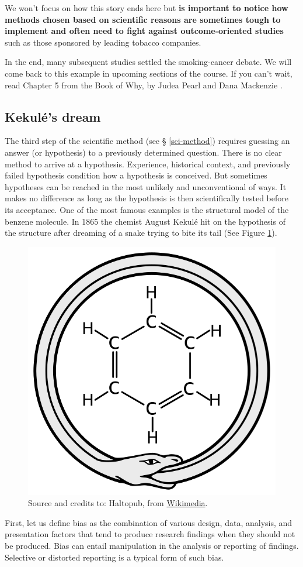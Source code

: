 \documentclass[
]{book}
\begin{document}
We won't focus on how this story ends here but \textbf{is important to notice how methods chosen based on scientific reasons are sometimes tough to implement and often need to fight against outcome-oriented studies} such as those sponsored by leading tobacco companies.

In the end, many subsequent studies settled the smoking-cancer debate. We will come back to this example in upcoming sections of the course. If you can't wait, read Chapter 5 from the Book of Why, by Judea Pearl and Dana Mackenzie \citep{book-of-why}.

\hypertarget{kekuluxe9s-dream}{%
\subsection{Kekulé's dream}\label{kekuluxe9s-dream}}

The third step of the scientific method (see § \ref{sci-method}) requires guessing an answer (or hypothesis) to a previously determined question. There is no clear method to arrive at a hypothesis. Experience, historical context, and previously failed hypothesis condition how a hypothesis is conceived. But sometimes hypotheses can be reached in the most unlikely and unconventional of ways. It makes no difference as long as the hypothesis is then scientifically tested before its acceptance. One of the most famous examples is the structural model of the benzene molecule. In 1865 the chemist August Kekulé hit on the hypothesis of the structure after dreaming of a snake trying to bite its tail (See Figure \ref{fig:ouroboros}).



\begin{figure}

{\centering \includegraphics[width=0.25\linewidth]{Figures/Ouroboros-benzene} 

}

\caption{Source and credits to: Haltopub, from \href{https://en.wikipedia.org/wiki/File:Ouroboros-benzene.svg}{Wikimedia}.}\label{fig:ouroboros}
\end{figure}

First, let us define bias as the combination of various design, data, analysis, and presentation factors that tend to produce research findings when they should not be produced. Bias can entail manipulation in the analysis or reporting of findings. Selective or distorted reporting is a typical form of such bias.
\end{document}
